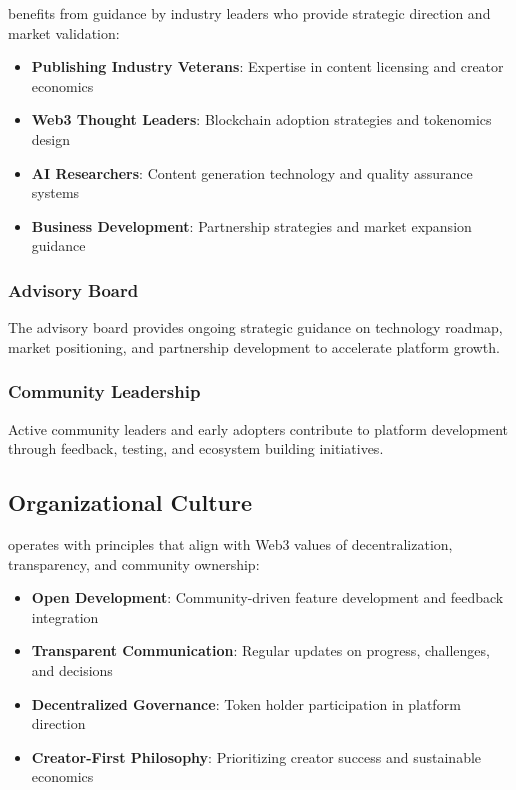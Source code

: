 \storyhouse{} benefits from guidance by industry leaders who provide strategic direction and market validation:

\begin{itemize}
    \item \textbf{Publishing Industry Veterans}: Expertise in content licensing and creator economics
    \item \textbf{Web3 Thought Leaders}: Blockchain adoption strategies and tokenomics design
    \item \textbf{AI Researchers}: Content generation technology and quality assurance systems
    \item \textbf{Business Development}: Partnership strategies and market expansion guidance
\end{itemize}

\subsubsection{Advisory Board}

The advisory board provides ongoing strategic guidance on technology roadmap, market positioning, and partnership development to accelerate platform growth.

\subsubsection{Community Leadership}

Active community leaders and early adopters contribute to platform development through feedback, testing, and ecosystem building initiatives.

\subsection{Organizational Culture}

\storyhouse{} operates with principles that align with Web3 values of decentralization, transparency, and community ownership:

\begin{itemize}
    \item \textbf{Open Development}: Community-driven feature development and feedback integration
    \item \textbf{Transparent Communication}: Regular updates on progress, challenges, and decisions
    \item \textbf{Decentralized Governance}: Token holder participation in platform direction
    \item \textbf{Creator-First Philosophy}: Prioritizing creator success and sustainable economics
\end{itemize}

